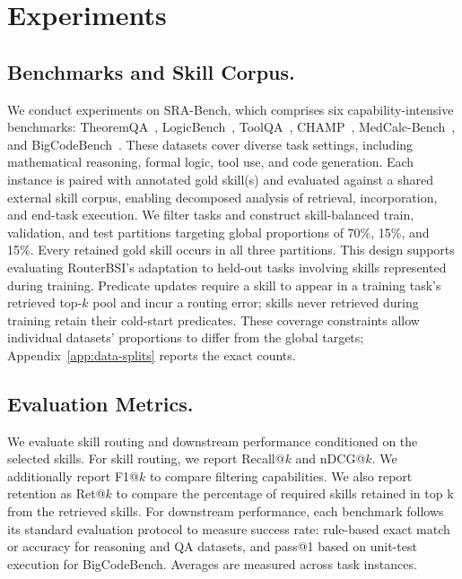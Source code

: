 
\section{Experiments}

\subsection{Benchmarks and Skill Corpus.}

We conduct experiments on SRA-Bench, which comprises six capability-intensive benchmarks: TheoremQA~\citep{chen-etal-2023-theoremqa}, LogicBench~\citep{parmar-etal-2024-logicbench}, ToolQA~\citep{NEURIPS2023_9cb2a749}, CHAMP~\citep{mao-etal-2024-champ}, MedCalc-Bench~\citep{NEURIPS2024_99e81750}, and BigCodeBench~\citep{ICLR2025_a6a90bcc}. These datasets cover diverse task settings, including mathematical reasoning, formal logic, tool use, and code generation. Each instance is paired with annotated gold skill(s) and evaluated against a shared external skill corpus, enabling decomposed analysis of retrieval, incorporation, and end-task execution. We filter tasks and construct skill-balanced train, validation, and test partitions targeting global proportions of 70\%, 15\%, and 15\%. Every retained gold skill occurs in all three partitions. This design supports evaluating RouterBSI\textquoteright{}s adaptation to held-out tasks involving skills represented during training. Predicate updates require a skill to appear in a training task\textquoteright{}s retrieved top-$k$ pool and incur a routing error; skills never retrieved during training retain their cold-start predicates. These coverage constraints allow individual datasets\textquoteright{} proportions to differ from the global targets; Appendix~\ref{app:data-splits} reports the exact counts.

\subsection{Evaluation Metrics.}

We evaluate skill routing and downstream performance conditioned on the selected skills. For skill routing, we report Recall@\(k\) and nDCG@\(k\). We additionally report F1@\(k\) to compare filtering capabilities. We also report retention as Ret@\(k\) to compare the percentage of required skills retained in top k from the retrieved skills. For downstream performance, each benchmark follows its standard evaluation protocol to measure success rate: rule-based exact match or accuracy for reasoning and QA datasets, and pass@1 based on unit-test execution for BigCodeBench. Averages are measured across task instances.

